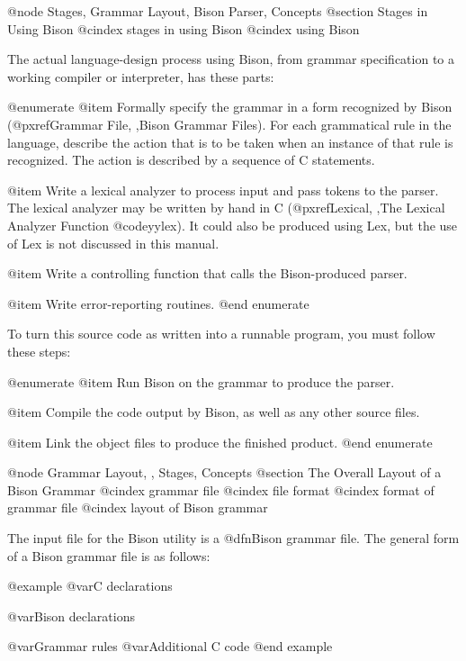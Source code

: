 @node Stages, Grammar Layout, Bison Parser, Concepts
@section Stages in Using Bison
@cindex stages in using Bison
@cindex using Bison

The actual language-design process using Bison, from grammar specification
to a working compiler or interpreter, has these parts:

@enumerate
@item
Formally specify the grammar in a form recognized by Bison
(@pxref{Grammar File, ,Bison Grammar Files}).  For each grammatical rule in the language,
describe the action that is to be taken when an instance of that rule
is recognized.  The action is described by a sequence of C statements.

@item
Write a lexical analyzer to process input and pass tokens to the
parser.  The lexical analyzer may be written by hand in C
(@pxref{Lexical, ,The Lexical Analyzer Function @code{yylex}}).  It could also be produced using Lex, but the use
of Lex is not discussed in this manual.

@item
Write a controlling function that calls the Bison-produced parser.

@item
Write error-reporting routines.
@end enumerate

To turn this source code as written into a runnable program, you
must follow these steps:

@enumerate
@item
Run Bison on the grammar to produce the parser.

@item
Compile the code output by Bison, as well as any other source files.

@item
Link the object files to produce the finished product.
@end enumerate

@node Grammar Layout,  , Stages, Concepts
@section The Overall Layout of a Bison Grammar
@cindex grammar file
@cindex file format
@cindex format of grammar file
@cindex layout of Bison grammar

The input file for the Bison utility is a @dfn{Bison grammar file}.  The
general form of a Bison grammar file is as follows:

@example
@var{C declarations}

@var{Bison declarations}

@var{Grammar rules}
@var{Additional C code}
@end example

